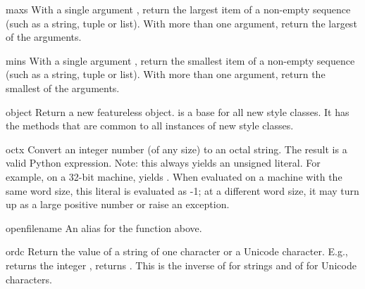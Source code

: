 \begin{funcdesc}{max}{s}
  With a single argument , return the largest item of a
  non-empty sequence (such as a string, tuple or list).  With more
  than one argument, return the largest of the arguments.
\end{funcdesc}

\begin{funcdesc}{min}{s}
  With a single argument , return the smallest item of a
  non-empty sequence (such as a string, tuple or list).  With more
  than one argument, return the smallest of the arguments.
\end{funcdesc}

\begin{funcdesc}{object}{}
Return a new featureless object.   is a base 
for all new style classes.  It has the methods that are common
to all instances of new style classes.

\end{funcdesc}

\begin{funcdesc}{oct}{x}
  Convert an integer number (of any size) to an octal string.  The
  result is a valid Python expression.  Note: this always yields an
  unsigned literal.  For example, on a 32-bit machine, 
  yields .  When evaluated on a machine with the
  same word size, this literal is evaluated as -1; at a different word
  size, it may turn up as a large positive number or raise an
   exception.
\end{funcdesc}

\begin{funcdesc}{open}{filename}
  An alias for the  function above.
\end{funcdesc}

\begin{funcdesc}{ord}{c}
  Return the \ASCII{} value of a string of one character or a Unicode
  character.  E.g.,  returns the integer ,
   returns .  This is the inverse of
   for strings and of  for Unicode
  characters.
\end{funcdesc}

